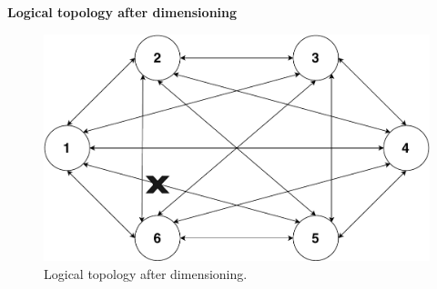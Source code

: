 \textbf{Logical topology after dimensioning}
\begin{figure}[H]
	\centering
	\includegraphics[width=13cm]{sdf/heuristic/transparent/figures/logicalAfterDimensioning}
	\caption{Logical topology after dimensioning.}
\end{figure} 
